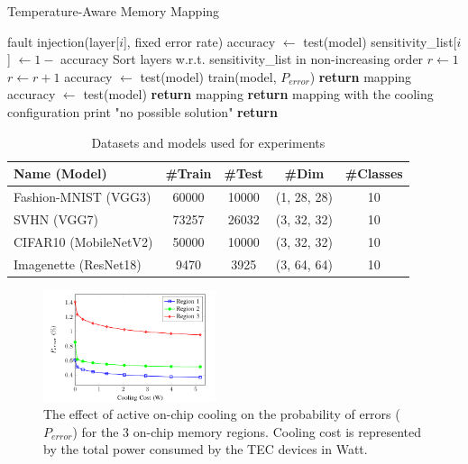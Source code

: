 \documentclass[sigconf]{acmart}
\begin{document}
\begin{algorithm}
\caption{Temperature-Aware Memory Mapping}
\begin{algorithmic}[1]
    \State fault injection(layer[$i$], fixed error rate)
    \State accuracy $\gets$ test(model)
    \State sensitivity\_list[$i$] $\gets 1 -$ accuracy
\EndFor
\State Sort layers w.r.t. sensitivity\_list in non-increasing order
\State $r \gets 1$
        \State $r \gets r + 1$
    \EndIf
\EndFor
\State accuracy $\gets$ test(model)
    \State train(model, $P_{error}$)
\Else
    \State \textbf{return} mapping
\EndIf
\State accuracy $\gets$ test(model)
    \State \textbf{return} mapping
    \State \textbf{return} mapping with the cooling configuration
\Else
    \State print "no possible solution"
    \State \textbf{return}
\EndIf
\end{algorithmic}
\end{algorithm}

\begin{table}
    \centering
    \caption{Datasets and models used for experiments}
    \begin{tabular}{@{}lcccc@{}}
        \toprule
        Name (Model) & \#Train & \#Test & \#Dim & \#Classes \\ \midrule
        Fashion-MNIST (VGG3) & 60000 & 10000 & (1, 28, 28) & 10 \\
        SVHN (VGG7) & 73257 & 26032 & (3, 32, 32) & 10 \\
        CIFAR10 (MobileNetV2) & 50000 & 10000 & (3, 32, 32) & 10 \\
        Imagenette (ResNet18) & 9470 & 3925 & (3, 64, 64) & 10 \\ \bottomrule
    \end{tabular}
\end{table}

\begin{figure}
    \centering
    \includegraphics[width=0.45\textwidth]{Figures/Picture2.png} 
    \caption{The effect of active on-chip cooling on the probability of
 errors ($P_{error}$) for the 3 on-chip memory regions. Cooling cost is
 represented by the total power consumed by the TEC devices in Watt.}
    \label{The effect of active on-chip coolingon the probabilityof
 errors (Perror) for the3on-chipmemory regions. Coolingcost is
 representedbythetotalpowerconsumedbytheTECdevicesinWatt.}
\end{figure}
\end{document}
